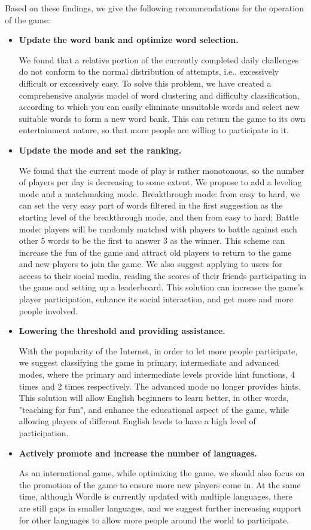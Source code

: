 \documentclass{MathModeling}
\begin{document}
	Based on these findings, we give the following recommendations for the operation of the game:

	\begin{itemize}
		\item \textbf{Update the word bank and optimize word selection. }
		
		We found that a relative portion of the currently completed daily challenges do not conform to the normal distribution of attempts, i.e., excessively difficult or excessively easy. To solve this problem, we have created a comprehensive analysis model of word clustering and difficulty classification, according to which you can easily eliminate unsuitable words and select new suitable words to form a new word bank. This can return the game to its own entertainment nature, so that more people are willing to participate in it.

		\item \textbf{Update the mode and set the ranking. }
		
		We found that the current mode of play is rather monotonous, so the number of players per day is decreasing to some extent. We propose to add a leveling mode and a matchmaking mode. Breakthrough mode: from easy to hard, we can set the very easy part of words filtered in the first suggestion as the starting level of the breakthrough mode, and then from easy to hard; Battle mode: players will be randomly matched with players to battle against each other 5 words to be the first to answer 3 as the winner. This scheme can increase the fun of the game and attract old players to return to the game and new players to join the game. We also suggest applying to users for access to their social media, reading the scores of their friends participating in the game and setting up a leaderboard. This solution can increase the game's player participation, enhance its social interaction, and get more and more people involved.

		\item \textbf{Lowering the threshold and providing assistance. }
		
		With the popularity of the Internet, in order to let more people participate, we suggest classifying the game in primary, intermediate and advanced modes, where the primary and intermediate levels provide hint functions, 4 times and 2 times respectively. The advanced mode no longer provides hints. This solution will allow English beginners to learn better, in other words, "teaching for fun", and enhance the educational aspect of the game, while allowing players of different English levels to have a high level of participation.

		\item \textbf{Actively promote and increase the number of languages. }
		
		As an international game, while optimizing the game, we should also focus on the promotion of the game to ensure more new players come in. At the same time, although Wordle is currently updated with multiple languages, there are still gaps in smaller languages, and we suggest further increasing support for other languages to allow more people around the world to participate.
	\end{itemize}
\end{document}
